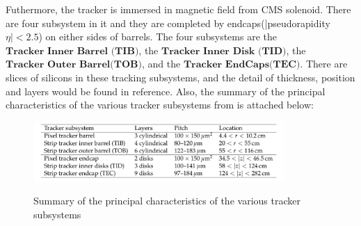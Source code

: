 			Futhermore, the tracker is immersed in magnetic field from CMS solenoid. There are four subsystem in it and they are completed by endcaps(|pseudorapidity $\eta | < 2.5$) on either sides of barrels. The four subsystems are the $\textbf{Tracker Inner Barrel (TIB)}$, the $\textbf{Tracker Inner Disk (TID)}$, the $\textbf{Tracker Outer Barrel(TOB)}$, and the $\textbf{Tracker EndCaps(TEC)}$. There are slices of silicons in these tracking subsystems, and the detail of thickness, position and layers would be found in reference\cite{Chatrchyan:2014fea}. Also, the summary of the principal characteristics of the various tracker subsystems from \cite{Chatrchyan:2014fea} is attached below:
			
			\begin{figure}[H]
			\centering{}
		    	\includegraphics[width=0.85\textwidth]{Figures/ExpApparatus/summary_subtracker.png}\\
			\caption{Summary of the principal characteristics of the various tracker subsystems\cite{Chatrchyan:2014fea}}
			\label{PhysObj:fig:tracker_sum}
			\end{figure}




